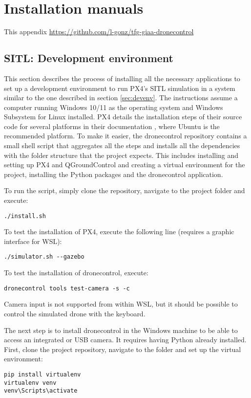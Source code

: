 \chapter{Installation manuals}

This appendix 
\url{https://github.com/l-gonz/tfg-giaa-dronecontrol}

\section{SITL: Development environment}
\label{app:install-dev-env}

This section describes the process of installing all the necessary applications to set up a development environment to run PX4's SITL simulation in a system similar to the one described in section \ref{sec:devenv}.
The instructions assume a computer running Windows 10/11 as the operating system and Windows Subsystem for Linux installed.
PX4 details the installation steps of their source code for several platforms in their documentation \cite{install-px4}, where Ubuntu is the recommended platform.
To make it easier, the dronecontrol repository contains a small shell script that aggregates all the steps and installs all the dependencies with the folder structure that the project expects.
This includes installing and setting up PX4 and QGroundControl and creating a virtual environment for the project, installing the Python packages and the dronecontrol application.

To run the script, simply clone the repository, navigate to the project folder and execute:
\begin{verbatim}
./install.sh
\end{verbatim}

To test the installation of PX4, execute the following line (requires a graphic interface for WSL):
\begin{verbatim}
./simulator.sh --gazebo
\end{verbatim}

To test the installation of dronecontrol, execute:
\begin{verbatim}
dronecontrol tools test-camera -s -c
\end{verbatim}
Camera input is not supported from within WSL, but it should be possible to control the simulated drone with the keyboard.

The next step is to install dronecontrol in the Windows machine to be able to access an integrated or USB camera.
It requires having Python already installed.
First, clone the project repository, navigate to the folder and set up the virtual environment:
\begin{verbatim}
pip install virtualenv
virtualenv venv
venv\Scripts\activate
\end{verbatim}

